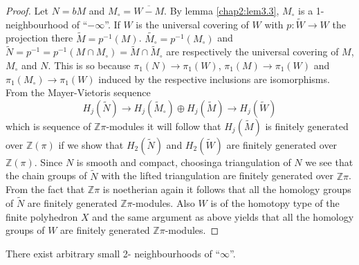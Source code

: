 \begin{proof}
Let $N = bM$ and $M_\circ = \overline{W - M}$. By lemma
\ref{chap2:lem3.3}, $M_\circ$ is a 
1-neighbourhood of ``$ - \infty$''. If $W$ is the universal covering
of $W$ with $p : \tilde{W} \to W$ the projection there $\tilde{M} =
p^{-1} (M)$. $\tilde{M_\circ} = p^{-1}(M_\circ)$ and $\tilde{N} = p^{-1} =
p^{-1} (M \cap M_\circ) = \tilde{M} \cap \tilde{M}_\circ$ are respectively the
universal covering of $M$, $M_\circ$ and $N$. This is so because $\pi_1 (N)
\rightarrow \pi_1 (W)$, $\pi_1 (M) \rightarrow \pi_1 (W)$ and $\pi_1 (M_\circ)
\rightarrow \pi_1(W)$ induced by the respective inclusions are
isomorphisms. From the Mayer-Vietoris sequence 
$$
H_j (\tilde{N}) \rightarrow H_j (\tilde{M}_\circ) \oplus H_j (\tilde{M}) 
\rightarrow H_j (\tilde{W}) 
$$
which is sequence of $\mathbb{Z} \pi$-modules it will follow that $H_j
(\tilde{M})$ is finitely generated over $\mathbb{Z} (\pi)$ if we show that
$H_2 (\tilde{N})$ and $H_2(\tilde{W})$ are finitely generated over
$\mathbb{Z}(\pi)$. Since $N$ is smooth and compact,
choosing\pageoriginale a 
triangulation of $N$ we see that the chain groups of
$\tilde{N}$ with the lifted triangulation are finitely generated over
$\mathbb{Z} \pi$. From the fact that $\mathbb{Z} \pi$ is noetherian
again it follows that all the homology groups of $\tilde{N}$ are
finitely generated $\mathbb{Z}\pi$-modules. Also $W$ is of the
homotopy type of the finite polyhedron $X$ and the same argument as
above yields that all the homology groups of $W$ are	finitely
generated $\mathbb{Z} \pi$-modules. 
\end{proof}

\begin{lemma}\label{chap2:lem3.5} %
There exist arbitrary small 2- neighbourhoods of ``$\infty$''.
\end{lemma}


